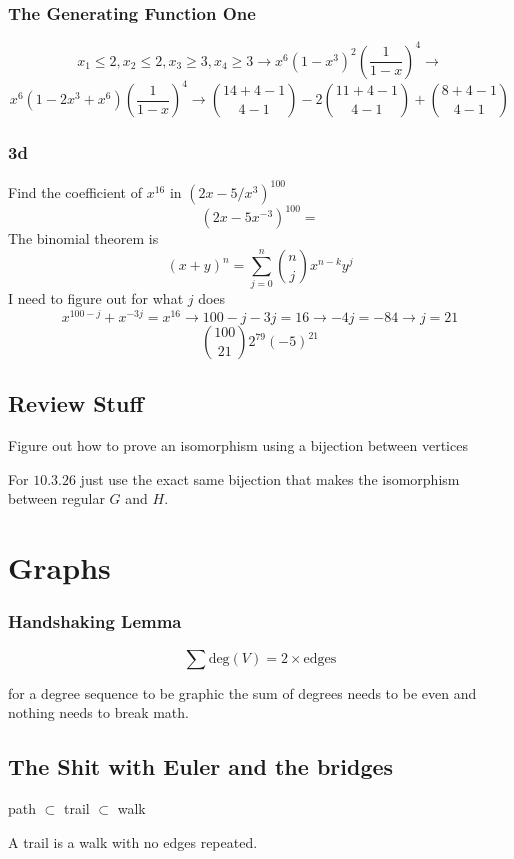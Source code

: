 \documentclass{report}
\begin{document}
\subsection{The Generating Function One}
\[
x_1 \leq 2, x_2 \leq 2, x_3 \geq 3, x_4 \geq 3
\rightarrow
x^6(1 - x^3)^2 \left( \frac{1}{1 - x} \right)^4
\rightarrow
\]
\[
x^6(1 - 2x^3 + x^6)\left( \frac{1}{1 - x} \right)^4
\rightarrow
{14 + 4 - 1 \choose 4 - 1} - 2{11 + 4 - 1 \choose 4 - 1} + {8 + 4 - 1 \choose 4 - 1}
\]


\newpage
\subsection{3d}
Find the coefficient of $x^{16}$ in $(2x - 5/x^3)^{100}$
\[
(2x - 5x^{-3})^{100} = 
\]
The binomial theorem is
\[
(x+y)^n = \sum^n_{j = 0} {n \choose j} x^{n-k}y^j
\]
I need to figure out for what $j$ does 
\[
x^{100 - j} + {x^{-3j}} = x^{16}
\rightarrow
100 - j - 3j = 16
\rightarrow
-4j = -84
\rightarrow
j = 21
\]
\[
{100 \choose 21}2^{79} (-5)^{21}
\]


\section{Review Stuff}
Figure out how to prove an isomorphism using a bijection between vertices

For $10.3.26$ just use the exact same bijection that makes the isomorphism between regular $G$ and $H$.


\chapter{Graphs}
\subsection{Handshaking Lemma}
\[
\sum \textrm{deg}(V) = 2 \times \textrm{edges}
\]

for a degree sequence to be graphic the sum of degrees needs to be even and nothing needs to break math.


\section{The Shit with Euler and the bridges}
\begin{center}
path $\subset$ trail $\subset$ walk
\end{center}
A trail is a walk with no edges repeated.
\end{document}
